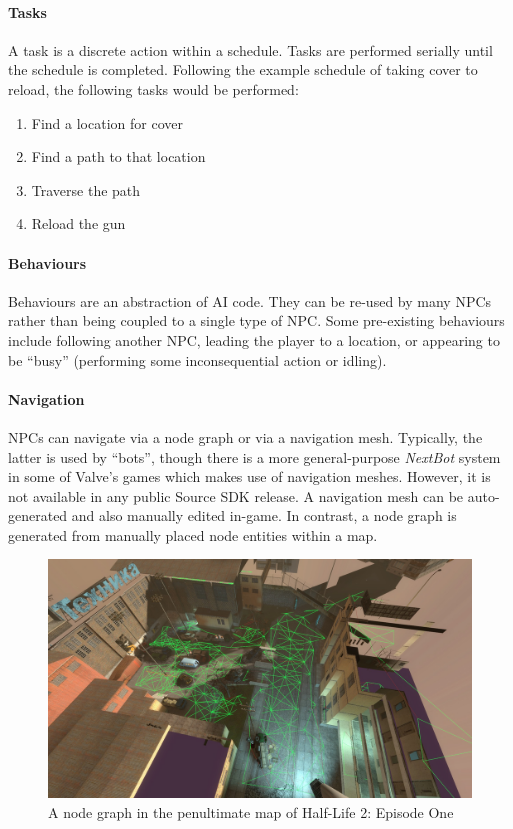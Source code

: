 \documentclass[a4paper, 12pt]{scrartcl}
\begin{document}
\paragraph{Tasks}
A task is a discrete action within a schedule. Tasks are performed serially until the schedule is completed. Following the example schedule of taking cover to reload, the following tasks would be performed:

\begin{enumerate}
  \item Find a location for cover
  \item Find a path to that location
  \item Traverse the path
  \item Reload the gun
\end{enumerate}

\paragraph{Behaviours}
Behaviours are an abstraction of AI code. They can be re-used by many NPCs rather than being coupled to a single type of NPC. Some pre-existing behaviours include following another NPC, leading the player to a location, or appearing to be ``busy'' (performing some inconsequential action or idling).

\paragraph{Navigation}
NPCs can navigate via a node graph or via a navigation mesh. Typically, the latter is used by ``bots'', though there is a more general-purpose \textit{NextBot} system in some of Valve's games which makes use of navigation meshes. However, it is not available in any public Source SDK release. A navigation mesh can be auto-generated and also manually edited in-game. In contrast, a node graph is generated from manually placed node entities within a map.

\begin{figure}[!htp]
  \centering
  \includegraphics[width=\linewidth]{images/source_node_graph.jpg}
  \caption{A node graph in the penultimate map of Half-Life 2: Episode One}
  \label{fig:source_node_graph}
\end{figure}
\end{document}
